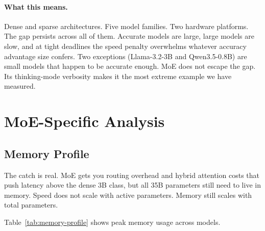 \documentclass[11pt]{article}
\begin{document}
\paragraph{What this means.}
Dense and sparse architectures.  Five model families.  Two hardware platforms.  The gap persists across all of them.  Accurate models are large, large models are slow, and at tight deadlines the speed penalty overwhelms whatever accuracy advantage size confers.  Two exceptions (Llama-3.2-3B and Qwen3.5-0.8B) are small models that happen to be accurate enough.  MoE does not escape the gap.  Its thinking-mode verbosity makes it the most extreme example we have measured.


\section{MoE-Specific Analysis}
\label{sec:moe-analysis}

\subsection{Memory Profile}
\label{sec:memory-profile}

The catch is real.  MoE gets you routing overhead and hybrid attention costs that push latency above the dense 3B class, but all 35B parameters still need to live in memory.  Speed does not scale with active parameters.  Memory still scales with total parameters.

Table~\ref{tab:memory-profile} shows peak memory usage across models.
\end{document}
